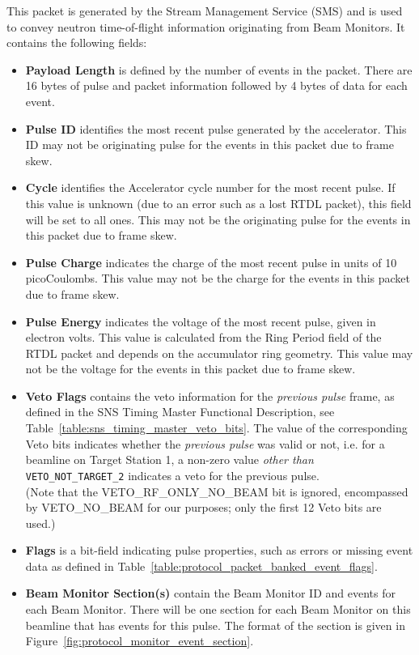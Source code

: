 This packet is generated by the
Stream Management Service (SMS) and is used to convey neutron time-of-flight
information originating from Beam Monitors. It contains the following fields:
\begin{itemize}
\item{\bf Payload Length} is defined by the number of events in the packet.
There are 16 bytes of pulse and packet information followed by 4 bytes of
data for each event.
\item{\bf Pulse ID} identifies the most recent pulse generated by the
accelerator. This ID may not be originating pulse for the events in this
packet due to frame skew.
\item{\bf Cycle} identifies the Accelerator cycle number for the most
recent pulse. If this value is unknown (due to an error such as a lost RTDL
packet), this field will be set to all ones. This may not be the originating
pulse for the events in this packet due to frame skew.
\item{\bf Pulse Charge} indicates the charge of the most recent pulse in units
of 10 picoCoulombs. This value may not be the charge for the events in this
packet due to frame skew.
\item{\bf Pulse Energy} indicates the voltage of the most recent pulse,
given in electron volts. This value is calculated from the Ring Period
field of the RTDL packet and depends on the accumulator ring geometry. This
value may not be the voltage for the events in this packet due to frame skew.
\item{\bf Veto Flags} contains the veto information
for the {\it previous pulse} frame,
as defined in the SNS Timing Master Functional Description,
see Table~\ref{table:sns_timing_master_veto_bits}.
The value of the corresponding Veto bits indicates whether the
{\it previous pulse} was valid or not,
i.e. for a beamline on Target Station 1,
a non-zero value {\it other than } {\tt VETO\_NOT\_TARGET\_2}
indicates a veto for the previous pulse. \\
(Note that the VETO\_RF\_ONLY\_NO\_BEAM bit is ignored,
encompassed by VETO\_NO\_BEAM for our purposes;
only the first 12 Veto bits are used.)
\item{\bf Flags} is a bit-field indicating pulse properties, such as errors or
missing event data as defined in
Table~\ref{table:protocol_packet_banked_event_flags}.
\item{\bf Beam Monitor Section(s)} contain the Beam Monitor ID and events
for each Beam Monitor. There will be one section for each Beam Monitor
on this beamline that has events for this pulse. The format of the section
is given in Figure~\ref{fig:protocol_monitor_event_section}.
\end{itemize}


